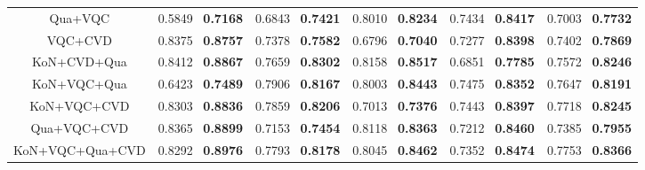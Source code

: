 \documentclass[journal]{IEEEtran}
\begin{document}
\begin{table*}[]
{\begin{tabular}{cclclclclcl}
Qua+VQC                   & \multicolumn{2}{c}{0.5849 \quad \ \textbf{0.7168}}  & \multicolumn{2}{c}{0.6843 \quad \ \textbf{0.7421}}    & \multicolumn{2}{c}{0.8010 \quad \ \textbf{0.8234}}        & \multicolumn{2}{c}{0.7434 \quad \ \textbf{0.8417}}   & \multicolumn{2}{c}{0.7003 \quad \ \textbf{0.7732}}               \\
VQC+CVD                & \multicolumn{2}{c}{0.8375 \quad \ \textbf{0.8757}}  & \multicolumn{2}{c}{0.7378 \quad \ \textbf{0.7582}}    & \multicolumn{2}{c}{0.6796 \quad \ \textbf{0.7040}}         & \multicolumn{2}{c}{0.7277 \quad \ \textbf{0.8398}}   & \multicolumn{2}{c}{0.7402 \quad \ \textbf{0.7869}}               \\
KoN+CVD+Qua        & \multicolumn{2}{c}{0.8412 \quad \ \textbf{0.8867}}  & \multicolumn{2}{c}{0.7659 \quad \ \textbf{0.8302}}    & \multicolumn{2}{c}{0.8158 \quad \ \textbf{0.8517}}        & \multicolumn{2}{c}{0.6851 \quad \ \textbf{0.7785}}   & \multicolumn{2}{c}{0.7572 \quad \ \textbf{0.8246}}               \\
KoN+VQC+Qua         & \multicolumn{2}{c}{0.6423 \quad \ \textbf{0.7489}}  & \multicolumn{2}{c}{0.7906 \quad \ \textbf{0.8167}}    & \multicolumn{2}{c}{0.8003 \quad \ \textbf{0.8443}}        & \multicolumn{2}{c}{0.7475 \quad \ \textbf{0.8352}}    & \multicolumn{2}{c}{0.7647 \quad \ \textbf{0.8191}}               \\
KoN+VQC+CVD              & \multicolumn{2}{c}{0.8303 \quad \ \textbf{0.8836}}  & \multicolumn{2}{c}{0.7859 \quad \ \textbf{0.8206}}    & \multicolumn{2}{c}{0.7013 \quad \ \textbf{0.7376}}        & \multicolumn{2}{c}{0.7443 \quad \ \textbf{0.8397}}   & \multicolumn{2}{c}{0.7718 \quad \ \textbf{0.8245}}               \\
Qua+VQC+CVD          & \multicolumn{2}{c}{0.8365 \quad \ \textbf{0.8899}}  & \multicolumn{2}{c}{0.7153 \quad \ \textbf{0.7454}}    & \multicolumn{2}{c}{0.8118 \quad \ \textbf{0.8363}}         & \multicolumn{2}{c}{0.7212 \quad \ \textbf{0.8460}}    & \multicolumn{2}{c}{0.7385 \quad \ \textbf{0.7955}}               \\
KoN+VQC+Qua+CVD & \multicolumn{2}{c}{0.8292 \quad \ \textbf{0.8976}}  & \multicolumn{2}{c}{0.7793 \quad \ \textbf{0.8178}}    & \multicolumn{2}{c}{0.8045 \quad \ \textbf{0.8462}}        & \multicolumn{2}{c}{0.7352 \quad \ \textbf{0.8474}}         & \multicolumn{2}{c}{0.7753 \quad \ \textbf{0.8366}}               \\ \bottomrule[1.1pt]
\end{tabular}}
\end{table*}
\end{document}
